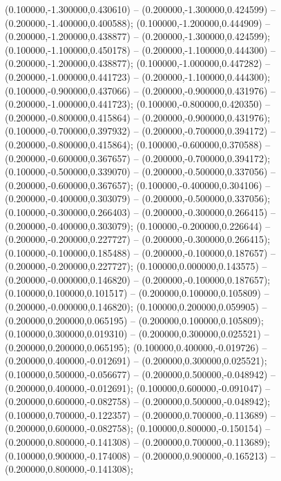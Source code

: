  (0.100000,-1.300000,0.430610) -- (0.200000,-1.300000,0.424599) -- (0.200000,-1.400000,0.400588);
 (0.100000,-1.200000,0.444909) -- (0.200000,-1.200000,0.438877) -- (0.200000,-1.300000,0.424599);
 (0.100000,-1.100000,0.450178) -- (0.200000,-1.100000,0.444300) -- (0.200000,-1.200000,0.438877);
 (0.100000,-1.000000,0.447282) -- (0.200000,-1.000000,0.441723) -- (0.200000,-1.100000,0.444300);
 (0.100000,-0.900000,0.437066) -- (0.200000,-0.900000,0.431976) -- (0.200000,-1.000000,0.441723);
 (0.100000,-0.800000,0.420350) -- (0.200000,-0.800000,0.415864) -- (0.200000,-0.900000,0.431976);
 (0.100000,-0.700000,0.397932) -- (0.200000,-0.700000,0.394172) -- (0.200000,-0.800000,0.415864);
 (0.100000,-0.600000,0.370588) -- (0.200000,-0.600000,0.367657) -- (0.200000,-0.700000,0.394172);
 (0.100000,-0.500000,0.339070) -- (0.200000,-0.500000,0.337056) -- (0.200000,-0.600000,0.367657);
 (0.100000,-0.400000,0.304106) -- (0.200000,-0.400000,0.303079) -- (0.200000,-0.500000,0.337056);
 (0.100000,-0.300000,0.266403) -- (0.200000,-0.300000,0.266415) -- (0.200000,-0.400000,0.303079);
 (0.100000,-0.200000,0.226644) -- (0.200000,-0.200000,0.227727) -- (0.200000,-0.300000,0.266415);
 (0.100000,-0.100000,0.185488) -- (0.200000,-0.100000,0.187657) -- (0.200000,-0.200000,0.227727);
 (0.100000,0.000000,0.143575) -- (0.200000,-0.000000,0.146820) -- (0.200000,-0.100000,0.187657);
 (0.100000,0.100000,0.101517) -- (0.200000,0.100000,0.105809) -- (0.200000,-0.000000,0.146820);
 (0.100000,0.200000,0.059905) -- (0.200000,0.200000,0.065195) -- (0.200000,0.100000,0.105809);
 (0.100000,0.300000,0.019310) -- (0.200000,0.300000,0.025521) -- (0.200000,0.200000,0.065195);
 (0.100000,0.400000,-0.019726) -- (0.200000,0.400000,-0.012691) -- (0.200000,0.300000,0.025521);
 (0.100000,0.500000,-0.056677) -- (0.200000,0.500000,-0.048942) -- (0.200000,0.400000,-0.012691);
 (0.100000,0.600000,-0.091047) -- (0.200000,0.600000,-0.082758) -- (0.200000,0.500000,-0.048942);
 (0.100000,0.700000,-0.122357) -- (0.200000,0.700000,-0.113689) -- (0.200000,0.600000,-0.082758);
 (0.100000,0.800000,-0.150154) -- (0.200000,0.800000,-0.141308) -- (0.200000,0.700000,-0.113689);
 (0.100000,0.900000,-0.174008) -- (0.200000,0.900000,-0.165213) -- (0.200000,0.800000,-0.141308);
